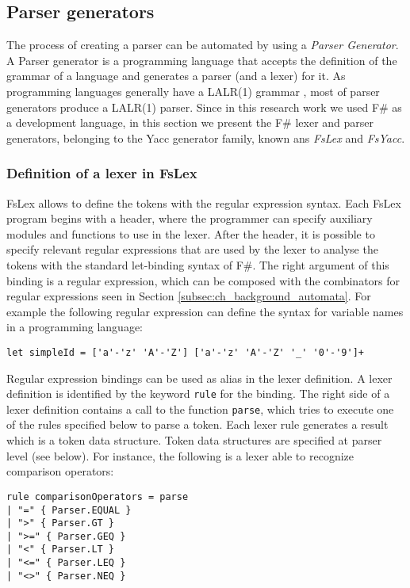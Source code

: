 \subsection{Parser generators}
\label{sec:ch_background_parser_generators}
The process of creating a parser can be automated by using a \textit{Parser Generator}. A Parser generator is a programming language that accepts the definition of the grammar of a language and generates a parser (and a lexer) for it. As programming languages generally have a LALR(1) grammar \cite{appel2002javacompiler}, most of parser generators produce a LALR(1) parser. Since in this research work we used F\# as a development language, in this section we present the F\# lexer and parser generators, belonging to the Yacc generator family, known ans \textit{FsLex} and \textit{FsYacc}.

\subsubsection{Definition of a lexer in FsLex}
FsLex allows to define the tokens with the regular expression syntax. Each FsLex program begins with a header, where the programmer can specify auxiliary modules and functions to use in the lexer. After the header, it is possible to specify relevant regular expressions that are used by the lexer to analyse the tokens with the standard let-binding syntax of F\#. The right argument of this binding is a regular expression, which can be composed with the combinators for regular expressions seen in Section \ref{subsec:ch_background_automata}. For example the following regular expression can define the syntax for variable names in a programming language:

\begin{lstlisting}
let simpleId = ['a'-'z' 'A'-'Z'] ['a'-'z' 'A'-'Z' '_' '0'-'9']+
\end{lstlisting}

Regular expression bindings can be used as alias in the lexer definition. A lexer definition is identified by the keyword \texttt{rule} for the binding. The right side of a lexer definition contains a call to the function \texttt{parse}, which tries to execute one of the rules specified below to parse a token. Each lexer rule generates a result which is a token data structure. Token data structures are specified at parser level (see below). For instance, the following is a lexer able to recognize comparison operators:

\begin{lstlisting}
rule comparisonOperators = parse
| "=" { Parser.EQUAL }
| ">" { Parser.GT }
| ">=" { Parser.GEQ }
| "<" { Parser.LT }
| "<=" { Parser.LEQ }
| "<>" { Parser.NEQ }
\end{lstlisting}

